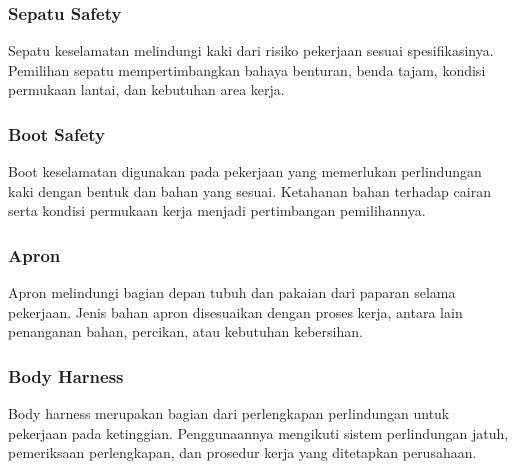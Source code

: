 
\Needspace{6.8cm}
\subsubsection{Sepatu Safety}

Sepatu keselamatan melindungi kaki dari risiko pekerjaan sesuai spesifikasinya. Pemilihan sepatu mempertimbangkan bahaya benturan, benda tajam, kondisi permukaan lantai, dan kebutuhan area kerja.


\Needspace{6.8cm}
\subsubsection{Boot Safety}

Boot keselamatan digunakan pada pekerjaan yang memerlukan perlindungan kaki dengan bentuk dan bahan yang sesuai. Ketahanan bahan terhadap cairan serta kondisi permukaan kerja menjadi pertimbangan pemilihannya.


\Needspace{6.8cm}
\subsubsection{Apron}

Apron melindungi bagian depan tubuh dan pakaian dari paparan selama pekerjaan. Jenis bahan apron disesuaikan dengan proses kerja, antara lain penanganan bahan, percikan, atau kebutuhan kebersihan.


\Needspace{6.8cm}
\subsubsection{Body Harness}

Body harness merupakan bagian dari perlengkapan perlindungan untuk pekerjaan pada ketinggian. Penggunaannya mengikuti sistem perlindungan jatuh, pemeriksaan perlengkapan, dan prosedur kerja yang ditetapkan perusahaan.

